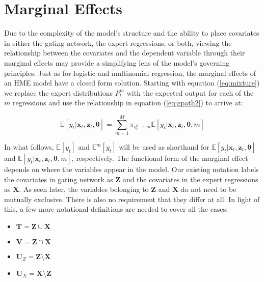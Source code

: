 \documentclass[12pt]{article}
\newcommand{\gateprod}[2]{\pi_{#1 \longrightarrow #2}}
\newcommand{\Eym}{\mathbb{E}^{m} \left[ y_{t} \right]}
\begin{document}
\section{Marginal Effects} \label{sec:MarginalEffects}

Due to the complexity of the model's structure and the ability to 
place covariates in either the gating network, the expert regressions,
or both, viewing the relationship between the covariates and the dependent
variable through their marginal effects may provide a simplifying lens of the 
model's governing principles. Just as for logistic and multinomial regression,
the marginal effects of an HME model have a closed form solution. Starting
with equation (\ref{eq:mixture}) we replace the expert distributions
$P^{m}_{t}$ with the expected output for each of the $m$ regressions and use
the relationship in equation (\ref{eq:gpath2}) to arrive at: 

\begin{equation} \label{eq:mixture2}
  \mathbb{E} \left[ y_{t} | \boldsymbol{x}_{t}, \boldsymbol{z}_{t}, \boldsymbol{\theta} \right] = \sum_{m=1}^{M} \gateprod{g^{0}_{t}}{m} \mathbb{E} \left[ y_{t} | \boldsymbol{x}_{t}, \boldsymbol{z}_{t}, \boldsymbol{\theta}, m \right]
\end{equation}

In what follows, $\mathbb{E} \left[y_{t}\right]$ and $\Eym$ will be used as shorthand
for $\mathbb{E} \left[ y_{t} | \boldsymbol{x}_{t}, \boldsymbol{z}_{t}, \boldsymbol{\theta} \right]$
and $\mathbb{E} \left[ y_{t} | \boldsymbol{x}_{t}, \boldsymbol{z}_{t}, \boldsymbol{\theta}, m \right]$,
respectively. The functional form of the marginal effect depends on where the variables
appear in the model. Our existing notation labels the covariates in gating
network as $\boldsymbol{Z}$ and the covariates in the expert regressions 
as $\boldsymbol{X}$. As seen later, the variables belonging to
$\boldsymbol{Z}$ and $\boldsymbol{X}$ do not need to be mutually
exclusive. There is also no requirement that they differ at all.
In light of this, a few more notational definitions are needed to cover
all the cases:

\begin{itemize}  
  \item $\boldsymbol{T} = \boldsymbol{Z} \cup \boldsymbol{X}$
  \item $\boldsymbol{V} = \boldsymbol{Z} \cap \boldsymbol{X}$
  \item $\boldsymbol{U}_{Z} = \boldsymbol{Z} \setminus \boldsymbol{X}$
  \item $\boldsymbol{U}_{X} = \boldsymbol{X} \setminus \boldsymbol{Z}$
\end{itemize}
\end{document}

